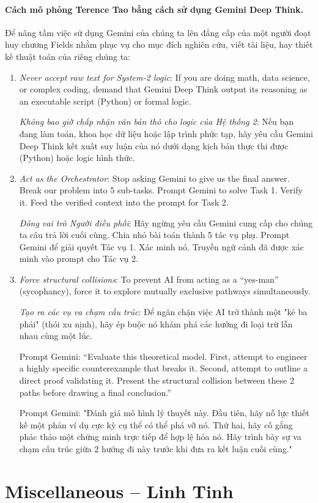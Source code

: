 \documentclass{article}
\begin{document}
\paragraph{Cách mô phỏng {\sc Terence Tao} bằng cách sử dụng Gemini Deep Think.} Để nâng tầm việc sử dụng Gemini của chúng ta lên đẳng cấp của một người đoạt huy chương Fields nhằm phục vụ cho mục đích nghiên cứu, viết tài liệu, hay thiết kế thuật toán của riêng chúng ta:
\begin{enumerate}
	\item \textit{Never accept raw text for System-2 logic}: If you are doing math, data science, or complex coding, demand that Gemini Deep Think output its reasoning as an executable script (Python) or formal logic.
	
	\textit{Không bao giờ chấp nhận văn bản thô cho logic của Hệ thống 2}: Nếu bạn đang làm toán, khoa học dữ liệu hoặc lập trình phức tạp, hãy yêu cầu Gemini Deep Think kết xuất suy luận của nó dưới dạng kịch bản thực thi được (Python) hoặc logic hình thức.
	\item \textit{Act as the Orchestrator}: Stop asking Gemini to give us the final answer. Break our problem into 5 sub-tasks. Prompt Gemini to solve Task 1. Verify it. Feed the verified context into the prompt for Task 2.
	
	\textit{Đóng vai trò Người điều phối}: Hãy ngừng yêu cầu Gemini cung cấp cho chúng ta câu trả lời cuối cùng. Chia nhỏ bài toán thành 5 tác vụ phụ. Prompt Gemini để giải quyết Tác vụ 1. Xác minh nó. Truyền ngữ cảnh đã được xác minh vào prompt cho Tác vụ 2.
	\item \textit{Force structural collisions}: To prevent AI from acting as a ``yes-man'' (sycophancy), force it to explore mutually exclusive pathways simultaneously.
	
	\textit{Tạo ra các vụ va chạm cấu trúc}: Để ngăn chặn việc AI trở thành một "kẻ ba phải" (thói xu nịnh), hãy ép buộc nó khám phá các hướng đi loại trừ lẫn nhau cùng một lúc.
	
	Prompt Gemini: ``Evaluate this theoretical model. First, attempt to engineer a highly specific counterexample that breaks it. Second, attempt to outline a direct proof validating it. Present the structural collision between these 2 paths before drawing a final conclusion.''
	
	Prompt Gemini: "Đánh giá mô hình lý thuyết này. Đầu tiên, hãy nỗ lực thiết kế một phản ví dụ cực kỳ cụ thể có thể phá vỡ nó. Thứ hai, hãy cố gắng phác thảo một chứng minh trực tiếp để hợp lệ hóa nó. Hãy trình bày sự va chạm cấu trúc giữa 2 hướng đi này trước khi đưa ra kết luận cuối cùng."
\end{enumerate}


\section{Miscellaneous -- Linh Tinh}


\printbibliography[heading=bibintoc]
	
\end{document}
